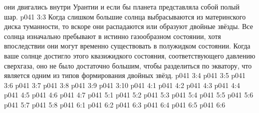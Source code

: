 они двигались внутри Урантии и если бы планета представляла собой полый шар.
\vs p041 3:3 \pc Когда слишком большие солнца выбрасываются из материнского диска туманности, то вскоре они распадаются или образуют двойные звёзды. Все солнца изначально пребывают в истинно газообразном состоянии, хотя впоследствии они могут временно существовать в полужидком состоянии. Когда ваше солнце достигло этого квазижидкого состояния, соответствующего давлению сверхгаза, оно не было достаточно большим, чтобы разделиться по экватору, что является одним из типов формирования двойных звёзд.
\vs p041 3:4 
\vs p041 3:5 \pc 
\vs p041 3:6 \pc 
\vs p041 3:7 
\vs p041 3:8 \pc 
\vs p041 3:9 
\vs p041 3:10 
\vs p041 4:1 
\vs p041 4:2 \pc 
\vs p041 4:3 \pc 
\vs p041 4:4 
\vs p041 4:5 
\vs p041 4:6 
\vs p041 4:7 
\vs p041 5:1 
\vs p041 5:2 
\vs p041 5:3 
\vs p041 5:4 
\vs p041 5:5 
\vs p041 5:6 \pc 
\vs p041 5:7 \pc 
\vs p041 5:8 
\vs p041 6:1 
\vs p041 6:2 
\vs p041 6:3 \pc 
\vs p041 6:4 
\vs p041 6:5 
\vs p041 6:6 \pc 
